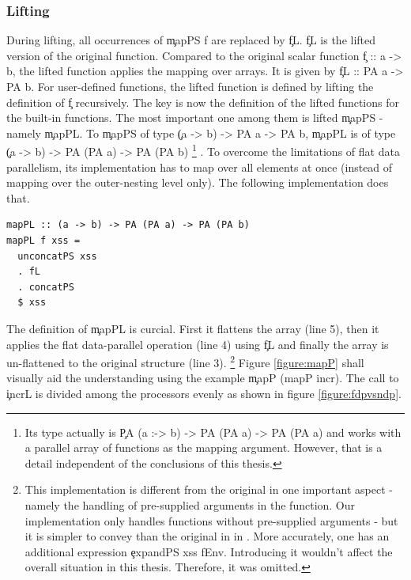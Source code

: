     \subsubsection{Lifting}
      During lifting, all occurrences of \c{mapPS f} are
      replaced by \c{fL}. \c{fL}
      is the lifted version of the original function.
      Compared to the original scalar function \c{f :: a -> b}, the lifted
      function applies the mapping over arrays. It is given by \c{fL :: PA a -> PA b}.
      For user-defined functions, the lifted function is defined by lifting the definition of \c{f} recursively.
      The key is now the definition of the lifted functions for the built-in functions.
      The most important one among them is lifted \c{mapPS} - namely \c{mapPL}.
      To \c{mapPS} of type \c{(a -> b) -> PA a -> PA b},
      \c{mapPL} is of type \c{(a -> b) -> PA (PA a) -> PA (PA b)}
      \footnote{Its type actually is \c{PA (a :-> b) -> PA (PA a) -> PA (PA a)}
      and works with a parallel array of functions as the mapping argument.
      However, that is a detail independent of the conclusions of this thesis.
      }
      .
      To overcome the limitations of flat data parallelism,
      its implementation has to map over all elements at once
      (instead of mapping over the outer-nesting level only).
      The following implementation does that.
    \begin{lstlisting}
mapPL :: (a -> b) -> PA (PA a) -> PA (PA b)
mapPL f xss =
  unconcatPS xss
  . fL
  . concatPS
  $ xss
    \end{lstlisting}
    The definition of \c{mapPL} is curcial.
    First it flattens the array (line 5), then it applies
    the flat data-parallel operation (line 4) using \c{fL}
    and finally the array is un-flattened to the original structure (line 3).
    \footnote{This implementation is different from the original in one important aspect - 
    namely the handling of pre-supplied arguments in the function. Our
    implementation only handles functions without pre-supplied arguments -
    but it is simpler to convey than the original in
    in \cite{HighOrdFlat2006}.
    More accurately, one has an additional expression \c{expandPS xss fEnv}.
    Introducing it wouldn't affect the overall situation in this thesis.
    Therefore, it was omitted.
    }
    Figure \ref{figure:mapP} shall visually aid the understanding
    using the example \c{mapP (mapP incr)}.
    The call to \c{incrL} is divided among the processors
    evenly as shown in figure \ref{figure:fdpvsndp}.

